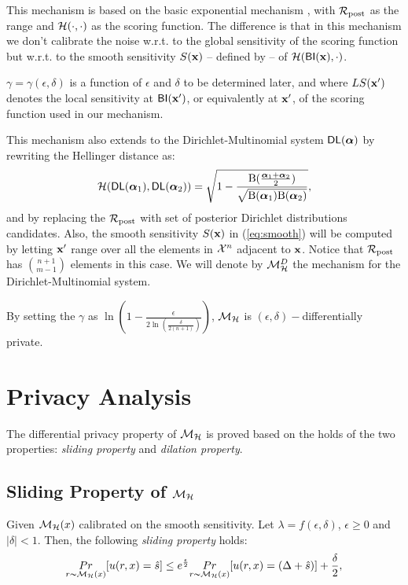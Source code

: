 \documentclass[sigconf]{acmart}
\begin{document}
This mechanism is based on the basic exponential mechanism
\cite{talwar}, with $\mathcal{R}_{\textup{post}}$ as the range and
$\mathcal{H}(\cdot,\cdot)$ as the scoring function. The difference is
that in this mechanism we don't calibrate the noise w.r.t. to the
global sensitivity of the scoring function but w.r.t. to the smooth
sensitivity $S(\textbf{x})$ -- defined by \citet{nissim2007smooth}-- of
$\mathcal{H}(\mathsf{BI}(\textbf{x}), \cdot)$.

$\gamma = \gamma(\epsilon, \delta)$ is a function of $\epsilon$ and $\delta$ to
be determined later, and where $LS(\textbf{x}')$ denotes the local
sensitivity at $\mathsf{BI}(\textbf{x}')$, or equivalently at $\textbf{x}'$,
of the scoring function used in our mechanism.

This mechanism also extends to the Dirichlet-Multinomial system $\mathsf{DL}(\boldsymbol{\alpha})$ by rewriting the Hellinger distance as:
\[
  \mathcal{H}(\mathsf{DL}(\boldsymbol{\alpha}_1), \mathsf{DL}(\boldsymbol{\alpha}_2)) = \sqrt{1 - \frac{\textup{B}(\frac{\boldsymbol{\alpha}_1 + \boldsymbol{\alpha}_2}{2})}{\sqrt{\textup{B}(\boldsymbol{\alpha}_1) \textup{B}(\boldsymbol{\alpha}_2)}}},
\]
and by replacing the $\mathcal{R}_{\textup{post}}$ with set of posterior Dirichlet
distributions candidates. Also, the smooth sensitivity $S(\textbf{x})$
in (\ref{eq:smooth}) will be computed by letting $\textbf{x}'$ range
over all the elements in $\mathcal{X}^{n}$ adjacent to $\textbf{x}$. Notice
that $\mathcal{R}_{\textup{post}}$ has $\binom{n + 1}{m - 1}$ elements in this case. We
will denote by $\mathcal{M}^{D}_{\mathcal{H}}$ the mechanism for the
Dirichlet-Multinomial system.


By setting the $\gamma$ as $\ln(1 - \frac{\epsilon}{2 \ln (\frac{\delta}{2 (n + 1)})})$, $\mathcal{M}_{\mathcal{H}}$ is $(\epsilon, \delta) -$differentially private.

\section{Privacy Analysis}
The differential privacy property of $\mathcal{M}_{\mathcal{H}}$ is proved based on the holds of the two properties: \emph{sliding property} and \emph{dilation property}.

\subsection{Sliding Property of $\mathcal{M}_{\mathcal{H}}$}
\begin{lem}
Given $\mathcal{M}_{\mathcal{H}}(x)$ calibrated on the smooth sensitivity. Let $\lambda = f(\epsilon,
\delta)$, $\epsilon\geq 0$ and $|\delta| < 1$. Then, the following \emph{sliding property} holds:
\begin{equation*}
\underset{r \thicksim \mathcal{M}_{\mathcal{H}}(x)}{Pr}[u(r,x) = \hat{s}]
\leq
e^{\frac{\epsilon}{2}} \underset{r \thicksim \mathcal{M}_{\mathcal{H}}(x)}{Pr}[u(r,x) = (\Delta + \hat{s})] + \frac{\delta}{2},
\end{equation*}

\end{lem}
\end{document}
